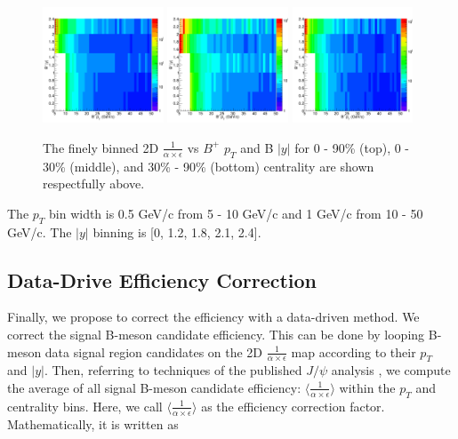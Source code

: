 \begin{figure}[h]
\begin{center}
\includegraphics[width= 0.32\textwidth]{Figures/Chapter5/BPEff2D_0_90.png}
\includegraphics[width= 0.32\textwidth]{Figures/Chapter5/BPEff2D_0_30.png}
\includegraphics[width= 0.32\textwidth]{Figures/Chapter5/BPEff2D_30_90.png}
\caption{The finely binned 2D $\frac{1}{\alpha \times \epsilon}$ vs $B^+$ $p_T$ and B $|y|$ for 0 - 90\% (top), 0 - 30\% (middle), and 30\% - 90\% (bottom) centrality are shown respectfully above.}
\label{BP2DMap}
\end{center}
\end{figure}

The $p_T$ bin width is 0.5 GeV/c from 5 - 10 GeV/c and 1 GeV/c from 10 - 50 GeV/c. The $|y|$ binning is [0, 1.2, 1.8, 2.1, 2.4].

\subsection{Data-Drive Efficiency Correction}

Finally, we propose to correct the efficiency with a data-driven method. We correct the signal B-meson candidate efficiency. This can be done by looping B-meson data signal region candidates on the 2D $\frac{1}{\alpha \times \epsilon}$ map according to their $p_T$ and $|y|$. Then, referring to techniques of the published $J/\psi$ analysis \cite{TnPMethod}, we compute the average of all signal B-meson candidate efficiency: $\langle\frac{1}{\alpha \times \epsilon} \rangle$ within the $p_T$ and centrality bins. Here, we call $\langle\frac{1}{\alpha \times \epsilon} \rangle$ as the efficiency correction factor. Mathematically, it is written as

